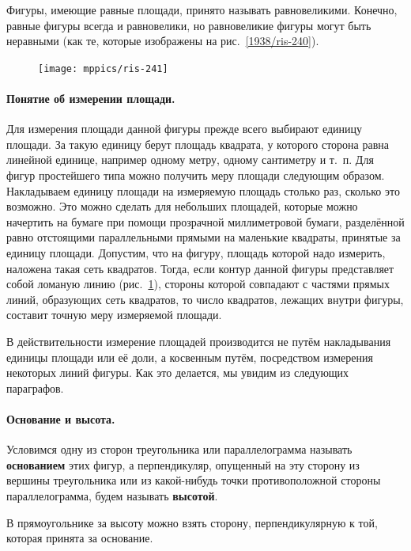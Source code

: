 \documentclass[oneside]{book}
\begin{document}
Фигуры, имеющие равные площади, принято называть равновеликими.
Конечно, равные фигуры всегда и равновелики, но равновеликие фигуры могут быть неравными (как те, которые изображены на рис.~\ref{1938/ris-240}).

\begin{figure}
\centering
\texttt{[image: mppics/ris-241]}
\caption{}\label{1938/ris-241}
\end{figure}

\paragraph{Понятие об измерении площади.}\label{1938/244}
Для измерения площади данной фигуры прежде всего выбирают единицу площади.
За такую единицу берут площадь квадрата, у которого сторона равна линейной единице, например одному метру, одному сантиметру и т.~п.
Для фигур простейшего типа можно получить меру площади следующим образом.
Накладываем единицу площади на измеряемую площадь столько раз, сколько это возможно.
Это можно сделать для небольших площадей, которые можно начертить на бумаге при помощи прозрачной миллиметровой %
бумаги, разделённой равно отстоящими параллельными прямыми на маленькие квадраты, принятые за единицу площади.
Допустим, что на фигуру, площадь которой надо измерить, наложена такая сеть квадратов.
Тогда, если контур данной фигуры представляет собой ломаную линию (рис.~\ref{1938/ris-241}), стороны которой совпадают с частями прямых линий, образующих сеть квадратов, то число квадратов, лежащих внутри фигуры, составит точную меру измеряемой площади.

В действительности измерение площадей производится не путём накладывания единицы площади или её доли, а косвенным путём, посредством измерения некоторых линий фигуры.
Как это делается, мы увидим из следующих параграфов.


\paragraph{Основание и высота.}\label{1938/245}
Условимся одну из сторон треугольника или параллелограмма называть \textbf{основанием} этих фигур, а перпендикуляр, опущенный на эту сторону из вершины треугольника или из какой-нибудь точки противоположной стороны параллелограмма, будем называть \textbf{высотой}.

В прямоугольнике за высоту можно взять сторону, перпендикулярную к той, которая принята за основание.
\end{document}

